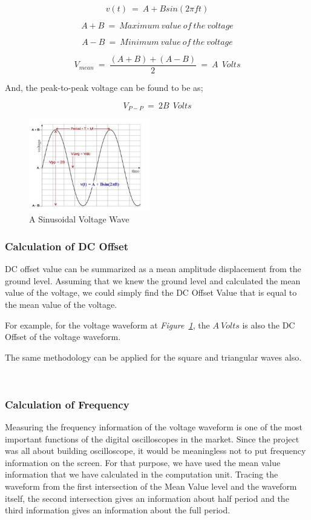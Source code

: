 \documentclass[paper]{IEEEtran}
\begin{document}
	$$	v(t)~=~A+Bsin(2 \pi ft)	$$	
	
	$$	A+B~=~Maximum~value~of~the~voltage 	$$

	$$	A-B~=~Minimum~value~of~the~voltage 	$$
	
	$$	V_{mean}~=~\frac{(A+B)+(A-B)}{2}~=~A~~Volts	$$	
	
	And, the peak-to-peak voltage can be found to be as;		
		
	$$ 	V_{P-P}~=~2B~~Volts	$$

\begin{figure}[h!]
	\setlength{\unitlength}{\textwidth}
	\center 
	\includegraphics[width=0.47\textwidth]{voltage2}
	\caption{\label{fig:sinvolt} A Sinusoidal Voltage Wave\cite{b5}}
\end{figure}


\subsubsection{Calculation of DC Offset}
\- \indent

	DC offset value can be summarized as a mean amplitude displacement from the ground level. Assuming that we knew the ground level and calculated the mean value of the voltage, we could simply find the DC Offset Value that is equal to the mean value of the voltage.
	
	For example, for the voltage waveform at \textit{Figure~\ref{fig:sinvolt}}, the $A~Volts$ is also the DC Offset of the voltage waveform.  

	The same methodology can be applied for the square and triangular waves also.
	
\-\\

\subsubsection{Calculation of Frequency}
\- \indent
	
	Measuring the frequency information of the voltage waveform is one of the most important functions of the digital oscilloscopes in the market. Since the project was all about building oscilloscope, it would be meaningless not to put frequency information on the screen. For that purpose, we have used the mean value information that we have calculated in the computation unit. Tracing the waveform from the first intersection of the Mean Value level and the waveform itself, the second intersection gives an information about half period and the third information gives an information about the full period.
	
\end{document}

